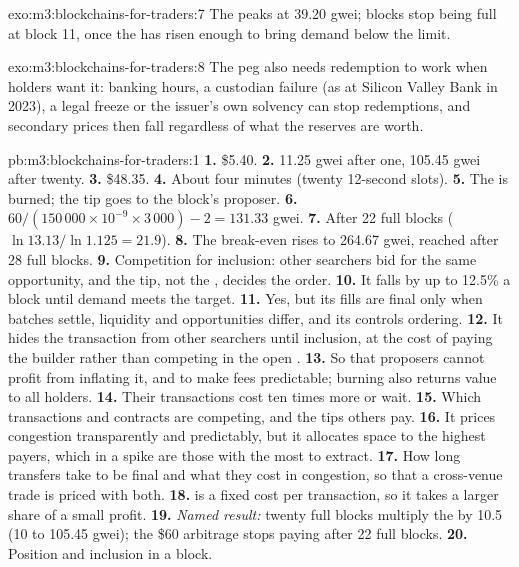 \begin{solution}{exo:m3:blockchains-for-traders:7}
The  peaks at 39.20 gwei; blocks stop being full at block 11, once the  has risen enough to bring
demand below the limit.
\end{solution}

\begin{solution}{exo:m3:blockchains-for-traders:8}
The peg also needs redemption to work when holders want it: banking hours, a custodian failure (as at Silicon
Valley Bank in 2023), a legal freeze or the issuer's own solvency can stop redemptions, and secondary prices then
fall regardless of what the reserves are worth.
\end{solution}

\begin{solution}{pb:m3:blockchains-for-traders:1}
\textbf{1.} \$5.40. \textbf{2.} 11.25 gwei after one, 105.45 gwei after twenty. \textbf{3.} \$48.35.
\textbf{4.} About four minutes (twenty 12-second slots). \textbf{5.} The  is burned; the tip goes to the
block's proposer. \textbf{6.} $60/(150\,000 \times 10^{-9} \times 3\,000) - 2 = 131.33$ gwei. \textbf{7.} After
22 full blocks ($\ln 13.13/\ln 1.125 = 21.9$). \textbf{8.} The break-even rises to 264.67 gwei, reached after 28
full blocks. \textbf{9.} Competition for inclusion: other searchers bid for the same opportunity, and the tip, not
the , decides the order. \textbf{10.} It falls by up to 12.5\% a block until demand meets the target.
\textbf{11.} Yes, but its fills are final only when batches settle, liquidity and opportunities differ, and its
 controls ordering. \textbf{12.} It hides the transaction from other searchers until inclusion, at the
cost of paying the builder rather than competing in the open . \textbf{13.} So that proposers cannot profit
from inflating it, and to make fees predictable; burning also returns value to all holders. \textbf{14.} Their
transactions cost ten times more or wait. \textbf{15.} Which transactions and contracts are competing, and the tips
others pay. \textbf{16.} It prices congestion transparently and predictably, but it allocates space to the highest
payers, which in a spike are those with the most to extract. \textbf{17.} How long transfers take to be final and
what they cost in congestion, so that a cross-venue trade is priced with both. \textbf{18.}  is a fixed cost per
transaction, so it takes a larger share of a small profit. \textbf{19.} \emph{Named result:} twenty full blocks
multiply the  by 10.5 (10 to 105.45 gwei); the \$60 arbitrage stops paying after 22 full blocks.
\textbf{20.} Position and inclusion in a block.
\end{solution}

